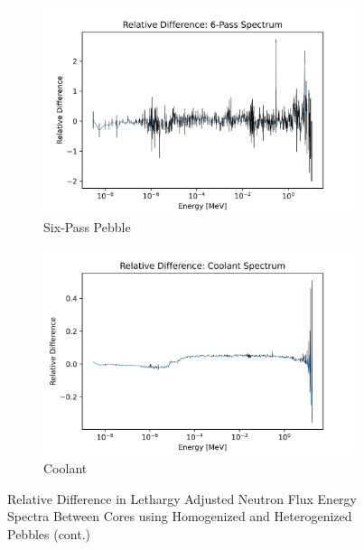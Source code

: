 \begin{figure}[H]\ContinuedFloat
\centering

\begin{subfigure}{0.95\textwidth}
  \includegraphics[width=0.95\linewidth]{figures/reldiff_six_spec}
  \caption{Six-Pass Pebble}
  \label{fig:diff-six}
\end{subfigure}%


\begin{subfigure}{0.95\textwidth}
  \includegraphics[width=0.95\linewidth]{figures/reldiff_cool_spec}
  \caption{Coolant}
  \label{fig:diff-cool}
\end{subfigure}%

\caption{Relative Difference in Lethargy Adjusted Neutron Flux Energy Spectra Between Cores using Homogenized and Heterogenized Pebbles (cont.)}
\end{figure}

